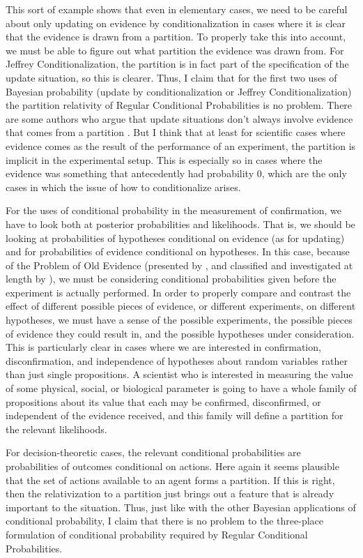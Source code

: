 This sort of example shows that even in elementary cases, we need to be careful about only updating on evidence by conditionalization in cases where it is clear that the evidence is drawn from a partition. To properly take this into account, we must be able to figure out what partition the evidence was drawn from. For Jeffrey Conditionalization, the partition is in fact part of the specification of the update situation, so this is clearer. Thus, I claim that for the first two uses of Bayesian probability (update by conditionalization or Jeffrey Conditionalization) the partition relativity of Regular Conditional Probabilities is no problem. There are some authors who argue that update situations don't always involve evidence that comes from a partition \citep{condnotmax, gallowpartition}. But I think that at least for scientific cases where evidence comes as the result of the performance of an experiment, the partition is implicit in the experimental setup. This is especially so in cases where the evidence was something that antecedently had probability $0$, which are the only cases in which the issue of how to conditionalize arises.

For the uses of conditional probability in the measurement of confirmation, we have to look both at posterior probabilities and likelihoods. That is, we should be looking at probabilities of hypotheses conditional on evidence (as for updating) and for probabilities of evidence conditional on hypotheses. In this case, because of the Problem of Old Evidence (presented by \citealp{tande}, and classified and investigated at length by \citealp{eellsold}), we must be considering conditional probabilities given before the experiment is actually performed. In order to properly compare and contrast the effect of different possible pieces of evidence, or different experiments, on different hypotheses, we must have a sense of the possible experiments, the possible pieces of evidence they could result in, and the possible hypotheses under consideration. This is particularly clear in cases where we are interested in confirmation, disconfirmation, and independence of hypotheses about random variables rather than just single propositions. A scientist who is interested in measuring the value of some physical, social, or biological parameter is going to have a whole family of propositions about its value that each may be confirmed, disconfirmed, or independent of the evidence received, and this family will define a partition for the relevant likelihoods.

For decision-theoretic cases, the relevant conditional probabilities are probabilities of outcomes conditional on actions. Here again it seems plausible that the set of actions available to an agent forms a partition. If this is right, then the relativization to a partition just brings out a feature that is already important to the situation. Thus, just like with the other Bayesian applications of conditional probability, I claim that there is no problem to the three-place formulation of conditional probability required by Regular Conditional Probabilities.

